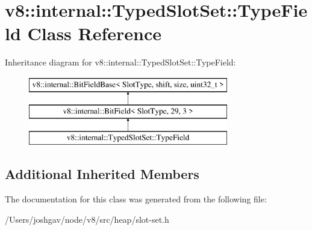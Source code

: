 \hypertarget{classv8_1_1internal_1_1_typed_slot_set_1_1_type_field}{}\section{v8\+:\+:internal\+:\+:Typed\+Slot\+Set\+:\+:Type\+Field Class Reference}
\label{classv8_1_1internal_1_1_typed_slot_set_1_1_type_field}
Inheritance diagram for v8\+:\+:internal\+:\+:Typed\+Slot\+Set\+:\+:Type\+Field\+:\begin{figure}[H]
\begin{center}
\leavevmode
\includegraphics[height=3.000000cm]{classv8_1_1internal_1_1_typed_slot_set_1_1_type_field}
\end{center}
\end{figure}
\subsection*{Additional Inherited Members}


The documentation for this class was generated from the following file\+:\begin{DoxyCompactItemize}
\item 
/\+Users/joshgav/node/v8/src/heap/slot-\/set.\+h\end{DoxyCompactItemize}
